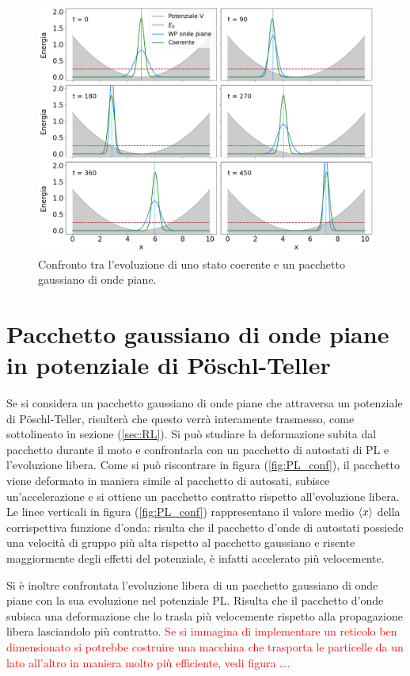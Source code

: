 \begin{figure}
    \centering
    \includegraphics[width = \textwidth]{immagini/coherent_vs_WP.png}
    \caption{Confronto tra l'evoluzione di uno stato coerente e un pacchetto gaussiano di onde piane.}
    \label{fig:co_vs_WP}
\end{figure}

\section{Pacchetto gaussiano di onde piane in potenziale di P\"oschl-Teller}
\label{sec:Wp_PL}

Se si considera un pacchetto gaussiano di onde piane che attraversa un potenziale di P\"oschl-Teller, risulterà che questo verrà interamente trasmesso, come sottolineato in sezione (\ref{sec:RL}).
Si può studiare la deformazione subita dal pacchetto durante il moto e confrontarla con un pacchetto di autostati di PL e l'evoluzione libera.
Come si può riscontrare in figura (\ref{fig:PL_conf}), il pacchetto viene deformato in maniera simile al pacchetto di autosati, subisce un'accelerazione e si ottiene un pacchetto contratto rispetto all'evoluzione libera. Le linee verticali in figura (\ref{fig:PL_conf}) rappresentano il valore medio $\expval{x}$ della corrispettiva funzione d'onda: risulta che il pacchetto d'onde di autostati possiede una velocità di gruppo più alta rispetto al pacchetto gaussiano e risente maggiormente degli effetti del potenziale, è infatti accelerato più velocemente.\cite{Mousavi:PL_WP}

Si è inoltre confrontata l'evoluzione libera di un pacchetto gaussiano di onde piane con la sua evoluzione nel potenziale PL. Risulta che il pacchetto d'onde subisca una deformazione che lo trasla più velocemente rispetto alla propagazione libera lasciandolo più contratto.\cite{Lecker:RL}
\textcolor{red}{ Se si immagina di implementare un reticolo ben dimensionato si potrebbe costruire una macchina che trasporta le particelle da un lato all'altro in maniera molto più efficiente, vedi figura \dots.} 

